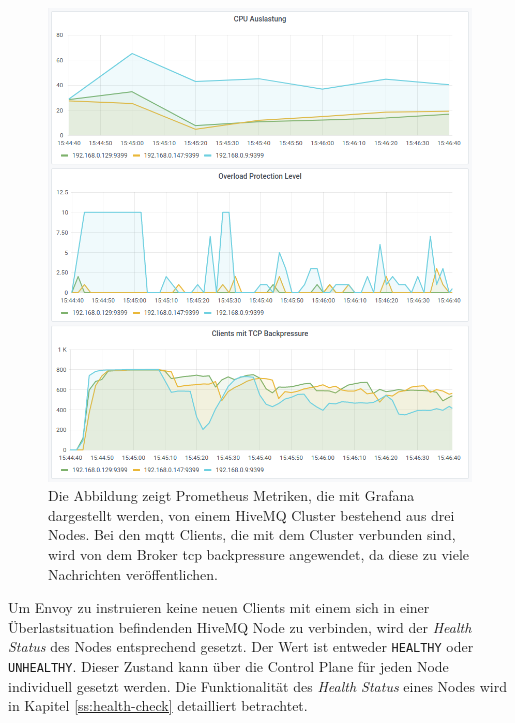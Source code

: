 \begin{figure}
    \centering
    \includegraphics[scale=0.8]{images/overload-protection.png}
    \caption{Die Abbildung zeigt Prometheus Metriken, die mit Grafana dargestellt werden, von einem HiveMQ Cluster bestehend aus drei Nodes. Bei den \ac{mqtt} Clients, die mit dem Cluster verbunden sind, wird von dem Broker \ac{tcp} backpressure angewendet, da diese zu viele Nachrichten veröffentlichen.}
    \label{fig:overload-protection}
\end{figure}
Um Envoy zu instruieren keine neuen Clients mit einem sich in einer Überlastsituation befindenden HiveMQ Node zu verbinden, wird der \textit{Health Status} des Nodes entsprechend gesetzt.
Der Wert ist entweder \verb|HEALTHY| oder \verb|UNHEALTHY|.
Dieser Zustand kann über die Control Plane für jeden Node individuell gesetzt werden.
\cite{HealthCheckEnvoy}
Die Funktionalität des \textit{Health Status} eines Nodes wird in Kapitel \ref{ss:health-check} detailliert betrachtet.

